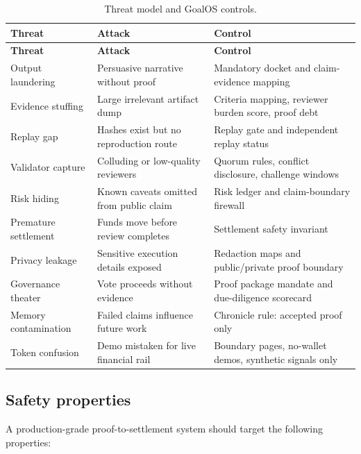 \begin{longtable}{p{} p{} p{}}
\caption{Threat model and GoalOS controls.}\label{tab:threats}\\
\toprule
\textbf{Threat} & \textbf{Attack} & \textbf{Control}\\
\midrule
\endfirsthead
\toprule
\textbf{Threat} & \textbf{Attack} & \textbf{Control}\\
\midrule
\endhead
Output laundering & Persuasive narrative without proof & Mandatory docket and claim-evidence mapping \\
Evidence stuffing & Large irrelevant artifact dump & Criteria mapping, reviewer burden score, proof debt \\
Replay gap & Hashes exist but no reproduction route & Replay gate and independent replay status \\
Validator capture & Colluding or low-quality reviewers & Quorum rules, conflict disclosure, challenge windows \\
Risk hiding & Known caveats omitted from public claim & Risk ledger and claim-boundary firewall \\
Premature settlement & Funds move before review completes & Settlement safety invariant \\
Privacy leakage & Sensitive execution details exposed & Redaction maps and public/private proof boundary \\
Governance theater & Vote proceeds without evidence & Proof package mandate and due-diligence scorecard \\
Memory contamination & Failed claims influence future work & Chronicle rule: accepted proof only \\
Token confusion & Demo mistaken for live financial rail & Boundary pages, no-wallet demos, synthetic signals only \\
\bottomrule
\end{longtable}

\subsection{Safety properties}

A production-grade proof-to-settlement system should target the following properties:

